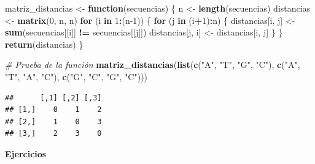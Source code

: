 \documentclass[
]{book}
\newenvironment{Shaded}{\begin{snugshade}}{\end{snugshade}}
\newcommand{\CommentTok}[1]{\textcolor[rgb]{0.56,0.35,0.01}{\textit{#1}}}
\newcommand{\ControlFlowTok}[1]{\textcolor[rgb]{0.13,0.29,0.53}{\textbf{#1}}}
\newcommand{\DecValTok}[1]{\textcolor[rgb]{0.00,0.00,0.81}{#1}}
\newcommand{\FunctionTok}[1]{\textcolor[rgb]{0.13,0.29,0.53}{\textbf{#1}}}
\newcommand{\NormalTok}[1]{#1}
\newcommand{\OtherTok}[1]{\textcolor[rgb]{0.56,0.35,0.01}{#1}}
\newcommand{\SpecialCharTok}[1]{\textcolor[rgb]{0.81,0.36,0.00}{\textbf{#1}}}
\newcommand{\StringTok}[1]{\textcolor[rgb]{0.31,0.60,0.02}{#1}}
\begin{document}
\begin{Shaded}
\begin{Highlighting}[]
\NormalTok{matriz\_distancias }\OtherTok{\textless{}{-}} \ControlFlowTok{function}\NormalTok{(secuencias) \{}
\NormalTok{  n }\OtherTok{\textless{}{-}} \FunctionTok{length}\NormalTok{(secuencias)}
\NormalTok{  distancias }\OtherTok{\textless{}{-}} \FunctionTok{matrix}\NormalTok{(}\DecValTok{0}\NormalTok{, n, n)}
  \ControlFlowTok{for}\NormalTok{ (i }\ControlFlowTok{in} \DecValTok{1}\SpecialCharTok{:}\NormalTok{(n}\DecValTok{{-}1}\NormalTok{)) \{}
    \ControlFlowTok{for}\NormalTok{ (j }\ControlFlowTok{in}\NormalTok{ (i}\SpecialCharTok{+}\DecValTok{1}\NormalTok{)}\SpecialCharTok{:}\NormalTok{n) \{}
\NormalTok{      distancias[i, j] }\OtherTok{\textless{}{-}} \FunctionTok{sum}\NormalTok{(secuencias[[i]] }\SpecialCharTok{!=}\NormalTok{ secuencias[[j]])}
\NormalTok{      distancias[j, i] }\OtherTok{\textless{}{-}}\NormalTok{ distancias[i, j]}
\NormalTok{    \}}
\NormalTok{  \}}
  \FunctionTok{return}\NormalTok{(distancias)}
\NormalTok{\}}

\CommentTok{\# Prueba de la función}
\FunctionTok{matriz\_distancias}\NormalTok{(}\FunctionTok{list}\NormalTok{(}\FunctionTok{c}\NormalTok{(}\StringTok{"A"}\NormalTok{, }\StringTok{"T"}\NormalTok{, }\StringTok{"G"}\NormalTok{, }\StringTok{"C"}\NormalTok{), }\FunctionTok{c}\NormalTok{(}\StringTok{"A"}\NormalTok{, }\StringTok{"T"}\NormalTok{, }\StringTok{"A"}\NormalTok{, }\StringTok{"C"}\NormalTok{), }\FunctionTok{c}\NormalTok{(}\StringTok{"G"}\NormalTok{, }\StringTok{"C"}\NormalTok{, }\StringTok{"G"}\NormalTok{, }\StringTok{"C"}\NormalTok{)))}
\end{Highlighting}
\end{Shaded}

\begin{verbatim}
##      [,1] [,2] [,3]
## [1,]    0    1    2
## [2,]    1    0    3
## [3,]    2    3    0
\end{verbatim}

\textbf{Ejercicios}
\end{document}
